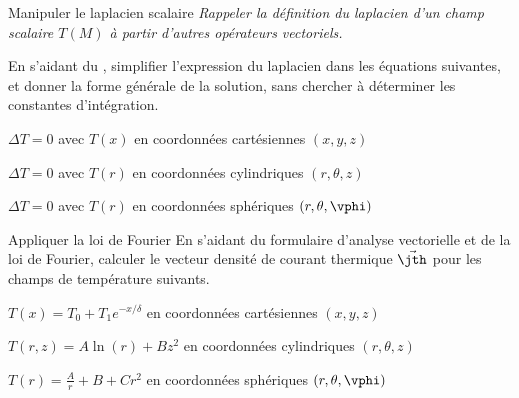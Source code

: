 \begin{exo}[PC][1][appli]{Manipuler le laplacien scalaire}
    \emph{Rappeler la définition du laplacien d'un champ scalaire $T(M)$ à partir d'autres opérateurs vectoriels.}
  \hauteurLargeurCadreReponse		{9mm}{7cm}


En s'aidant du , simplifier l'expression du laplacien dans les équations suivantes, et donner la forme générale de la solution, sans chercher à déterminer les constantes d'intégration.

\begin{enonce}
  $\Delta T = 0$ avec $T(x)$ en coordonnées cartésiennes $(x,y,z)$
\end{enonce}

\begin{enonce}
  $\Delta T = 0$ avec $T(r)$ en coordonnées cylindriques $(r,\theta,z)$
\end{enonce}

\begin{enonce}
  $\Delta T = 0$ avec $T(r)$ en coordonnées sphériques $(r,\theta,\vphi)$
\end{enonce}

\end{exo}

\begin{exo}[PC][1][appli]{Appliquer la loi de Fourier}
  \hauteurLargeurCadreReponse		{9mm}{7cm}
En s'aidant du formulaire d'analyse vectorielle et de la loi de Fourier, calculer le vecteur densité de courant thermique $\Vec{\jth}$ pour les champs de température suivants.

\begin{enonce}
  $T(x)=T_0 + T_1e^{-x/\delta}$ en coordonnées cartésiennes $(x,y,z)$
\end{enonce}

\begin{enonce}
  $T(r,z) = A\ln(r) + Bz^2$ en coordonnées cylindriques $(r,\theta,z)$
\end{enonce}

\begin{enonce}
  $T(r) = \frac{A}{r} + B + C r^2$ en coordonnées sphériques $(r,\theta,\vphi)$
\end{enonce}

\end{exo}


